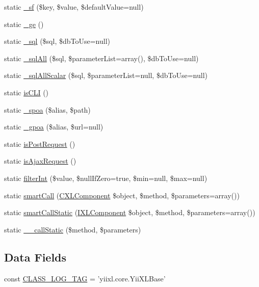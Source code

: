 \begin{DoxyCompactItemize}
\item 
static \hyperlink{classYiiXLBase_ac2bdee30f3e1ff39d01e094d6c6c311e}{\_\-sf} (\$key, \$value, \$defaultValue=null)
\item 
static \hyperlink{classYiiXLBase_aadc4f61a58cb31fe918a67c67d9646c7}{\_\-ge} ()
\item 
static \hyperlink{classYiiXLBase_a539756575c5f36371f4267d89eb443f7}{\_\-sql} (\$sql, \$dbToUse=null)
\item 
static \hyperlink{classYiiXLBase_a0e881421b99ec642662a4512c8ea5f0f}{\_\-sqlAll} (\$sql, \$parameterList=array(), \$dbToUse=null)
\item 
static \hyperlink{classYiiXLBase_a5a5366761d080ff8519cc21617ecdbe1}{\_\-sqlAllScalar} (\$sql, \$parameterList=null, \$dbToUse=null)
\item 
static \hyperlink{classYiiXLBase_a30e8d8207d35adf28c3847fa4b6cc86a}{isCLI} ()
\item 
static \hyperlink{classYiiXLBase_ab02e1c46b44a987b618518eb50dbfa59}{\_\-spoa} (\$alias, \$path)
\item 
static \hyperlink{classYiiXLBase_a3447bf2ade7892df7faaaf37b5068bc8}{\_\-gpoa} (\$alias, \$url=null)
\item 
static \hyperlink{classYiiXLBase_a58562fcc2fc0a157f361c6eae58b641c}{isPostRequest} ()
\item 
static \hyperlink{classYiiXLBase_ad29992b5c09cbad51dc5978f09903b28}{isAjaxRequest} ()
\item 
static \hyperlink{classYiiXLBase_af85a0a7c257706608cc74ce7074c1ea6}{filterInt} (\$value, \$nullIfZero=true, \$min=null, \$max=null)
\item 
static \hyperlink{classYiiXLBase_a738b26d91bc5e75ef095583e5977c291}{smartCall} (\hyperlink{classCXLComponent}{CXLComponent} \$object, \$method, \$parameters=array())
\item 
static \hyperlink{classYiiXLBase_ae5d0ba8b15e7556712294e8dc37cd837}{smartCallStatic} (\hyperlink{interfaceIXLComponent}{IXLComponent} \$object, \$method, \$parameters=array())
\item 
static \hyperlink{classYiiXLBase_acbd78589c6aeb0ca39eaacbc9bbcbbf3}{\_\-\_\-callStatic} (\$method, \$parameters)
\end{DoxyCompactItemize}
\subsection*{Data Fields}
\begin{DoxyCompactItemize}
\item 
const \hyperlink{classYiiXLBase_aa607ab5e557e6ebb60b85c5a20ad067f}{CLASS\_\-LOG\_\-TAG} = 'yiixl.core.YiiXLBase'
\end{DoxyCompactItemize}
